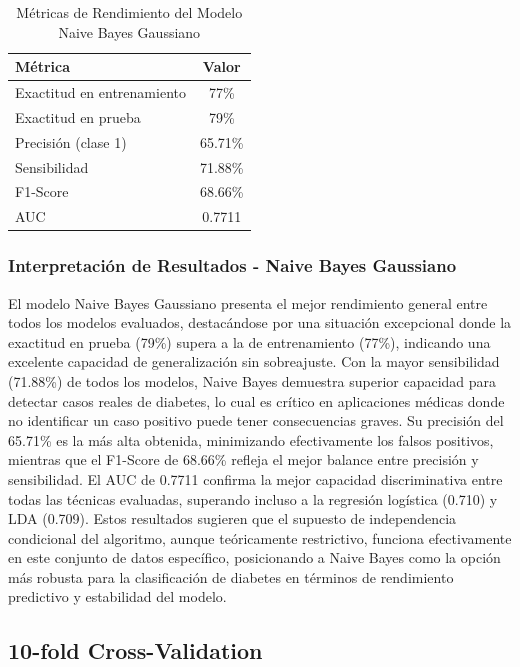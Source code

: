 \documentclass[12pt,a4paper]{article}
\begin{document}
\begin{table}[H]
\centering
\caption{Métricas de Rendimiento del Modelo Naive Bayes Gaussiano}\label{tab:nb_resultados}
\begin{tabular}{lc}
\toprule
\textbf{Métrica} & \textbf{Valor} \\
\midrule
Exactitud en entrenamiento & 77\% \\
Exactitud en prueba & 79\% \\
Precisión (clase 1) & 65.71\% \\
Sensibilidad & 71.88\% \\
F1-Score & 68.66\% \\
AUC & 0.7711 \\
\bottomrule
\end{tabular}
\end{table}

\subsubsection{Interpretación de Resultados - Naive Bayes Gaussiano}

El modelo Naive Bayes Gaussiano presenta el mejor rendimiento general entre todos los modelos evaluados, destacándose por una situación excepcional donde la exactitud en prueba (79\%) supera a la de entrenamiento (77\%), indicando una excelente capacidad de generalización sin sobreajuste. Con la mayor sensibilidad (71.88\%) de todos los modelos, Naive Bayes demuestra superior capacidad para detectar casos reales de diabetes, lo cual es crítico en aplicaciones médicas donde no identificar un caso positivo puede tener consecuencias graves. Su precisión del 65.71\% es la más alta obtenida, minimizando efectivamente los falsos positivos, mientras que el F1-Score de 68.66\% refleja el mejor balance entre precisión y sensibilidad. El AUC de 0.7711 confirma la mejor capacidad discriminativa entre todas las técnicas evaluadas, superando incluso a la regresión logística (0.710) y LDA (0.709). Estos resultados sugieren que el supuesto de independencia condicional del algoritmo, aunque teóricamente restrictivo, funciona efectivamente en este conjunto de datos específico, posicionando a Naive Bayes como la opción más robusta para la clasificación de diabetes en términos de rendimiento predictivo y estabilidad del modelo.

\newpage

\subsection{10-fold Cross-Validation}
\end{document}

